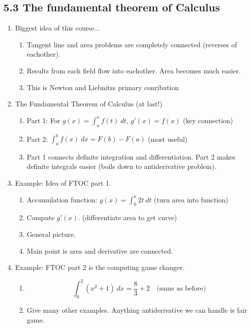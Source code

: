 \documentclass{article}
\begin{document}
\subsection{5.3 The fundamental theorem of Calculus}
\begin{enumerate}

\item Biggest idea of this course...
\begin{enumerate}
\item Tangent line and area problems are completely connected (reverses of eachother).
\item Results from each field flow into eachother. Area becomes much easier.
\item This is Newton and Liebnitzs primary conribution
\end{enumerate}

\item The Fundamental Theorem of Calculus (at last!)
\begin{enumerate}
\item Part 1: For $g(x) = \int_a^x f(t)~dt$, $g'(x) = f(x)$ (key connection)
\item Part 2: $\int_a^b f(x) ~dx = F(b)-F(a)$ (most useful)
\item Part 1 connects definite integration and differentiation. Part 2 makes definite integrals easier (boils down to antiderivative problem).
\end{enumerate}

\item Example: Idea of FTOC part 1.
\begin{enumerate}
\item Accumulation function: $g(x) = \int_0^x 2t ~dt$ (turn area into function)
\item Compute $g'(x)$. (differentiate area to get curve)
\item General picture.
\item Main point is area and derivative are connected.
\end{enumerate}

\item Example: FTOC part 2 is the computing game changer.
\begin{enumerate}
\item 
$$
\int_0^2(x^2+1)~dx = \frac{8}{3} + 2 \quad \text{(same as before)}
$$
\item Give many other examples. Anything antiderivative we can handle is fair game.
\end{enumerate}


\end{enumerate}
\end{document}
